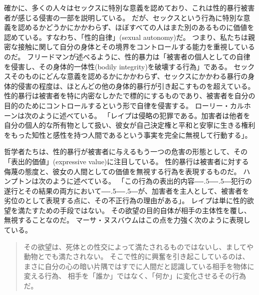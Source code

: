 \documentclass[paper=a4,book,openany]{jlreq}
\newcommand{\ig}[1]{}           %
\def\DDASH{―\kern-.5\zw―\kern-.5\zw―} %
\begin{document}
確かに、多くの人々はセックスに特別な意義を認めており、これは性的暴行被害者が感じる侵害の一部を説明している。
だが、セックスという行為に特別な意義を認めるかどうかにかかわらず、ほぼすべての人はまた別のあるものに価値を認めている。すなわち、「性的自律」(sexual autonomy)だ。
つまり、私たちは親密な接触に関して自分の身体とその境界をコントロールする能力を重視しているのだ。
フリードマン\ig{Karyn L. Freedman}が述べるように、性的暴力は「被害者の個人としての自律を侵害し、その身体的一体性(bodily integrity)を破壊する行為」である。
セックスそのものにどんな意義を認めるかにかかわらず、セックスにかかわる暴行の身体的侵害の程度は、ほとんどの他の身体的暴行が引き起こすものを超えている。
性的暴行は被害者を特に内密なしかたで標的にするものであり、被害者を自分の目的のためにコントロールするという形で自律を侵害する。
ローリー・カルホーン\ig{Laurie Calhoun}は次のように述べている。
「レイプは侵略の犯罪である。加害者は他者を自分の個人的な所有物として扱い、彼女が自己決定権と平和と安寧に生きる権利をもった知性と感性を持つ人間であるという事実を完全に無視して行動する」\citep[p.109]{calhoun97:_rape}。

哲学者たちは、性的暴行が被害者に与えるもう一つの危害の形態として、その「表出的価値」(expressive value)に注目している。
性的暴行は被害者に対する侮蔑の態度と、彼女の人間としての価値を無視する行為を表現するものだ。
ハンプトンは次のように述べている。
「この行為の表出的内容{\DDASH}犯行の遂行とその結果の両方において{\DDASH}が、加害者を主人として、被害者を劣位のとして表現する点に、その不正行為の理由がある」\citep[p.135]{hampton99:_defin_wrong_and_defin_rape}。
レイプは単に性的欲望を満たすための手段ではない。
その欲望の目的自体が相手の主体性を覆し、無視することなのだ。
マーサ・ヌスバウムはこの点を力強く次のように表現している。

\begin{quote}
その欲望は、死体との性交によって満たされるものではないし、ましてや動物とでも満たされない。
そこで性的に興奮を引き起こしているのは、まさに自分の心の暗い片隅ではすでに人間だと認識している相手を物体に変える行為、
相手を「誰か」ではなく、「何か」に変化させるその行為だ。
\citep[p.281]{nussbaum95:_objec}
\end{quote}
\end{document}
